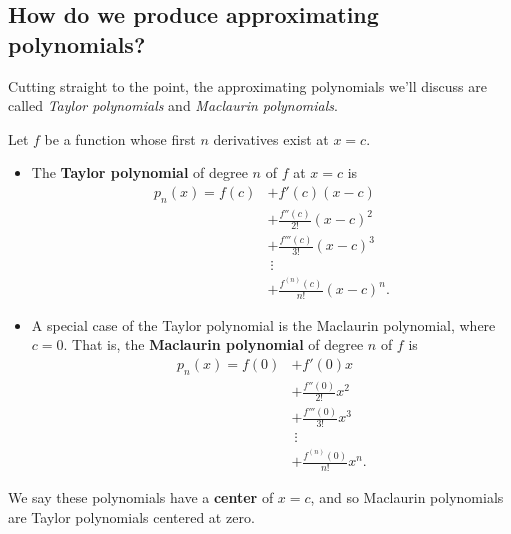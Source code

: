 \documentclass{ximera}
\begin{document}
\subsection{How do we produce approximating polynomials?}

Cutting straight to the point, the approximating polynomials we'll
discuss are called \textit{Taylor polynomials} and \textit{Maclaurin
  polynomials}.

\begin{definition}
  Let $f$ be a function whose first $n$ derivatives exist at $x=c$.
  \begin{itemize}
  \item The \textbf{Taylor polynomial} of degree $n$ of $f$ at $x=c$ is
    \begin{align*}
      p_n(x) = f(c) &+ f'(c)(x-c) \\
      &+ \frac{f''(c)}{2!}(x-c)^2 \\
      &+\frac{f'''(c)}{3!}(x-c)^3 \\
      &\ \vdots \\
      &+\frac{f^{(n)}(c)}{n!}(x-c)^n.
    \end{align*}
  \item A special case of the Taylor polynomial is the Maclaurin
    polynomial, where $c=0$. That is, the \textbf{Maclaurin polynomial}
    of degree $n$ of $f$ is
    \begin{align*}
      p_n(x) = f(0) &+ f'(0)x \\
      &+\frac{f''(0)}{2!}x^2\\
      &+\frac{f'''(0)}{3!}x^3\\
      &\ \vdots\\
      &+\frac{f^{(n)}(0)}{n!}x^n.
    \end{align*}
  \end{itemize}
  We say these polynomials have a \textbf{center} of $x=c$, and so
  Maclaurin polynomials are Taylor polynomials centered at
  zero.
\end{definition}
\end{document}
